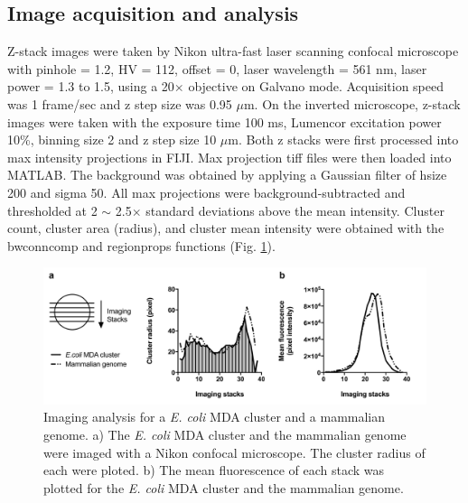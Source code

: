 \subsection{Image acquisition and analysis}
Z-stack images were taken by Nikon ultra-fast laser scanning confocal microscope with pinhole = 1.2, HV = 112, offset = 0, laser wavelength = 561 nm, laser power = 1.3 to 1.5, using a 20$\times$ objective on Galvano mode. Acquisition speed was 1 frame\slash sec and z step size was 0.95 $\mu$m. On the inverted microscope, z-stack images were taken with the exposure time 100 ms, Lumencor excitation power 10\%, binning size 2 and z step size 10 $\mu$m. Both z stacks were first processed into max intensity projections in FIJI. Max projection tiff files were then loaded into MATLAB. The background was obtained by applying a Gaussian filter of hsize 200 and sigma 50. All max projections were background-subtracted and thresholded at 2 $\sim$ 2.5$\times$ standard deviations above the mean intensity. Cluster count, cluster area (radius), and cluster mean intensity were obtained with the bwconncomp and regionprops functions (Fig. \ref{fig:dMDA_MammalianEcoliCluster}).

\begin{figure}
\centering
\includegraphics[keepaspectratio,width=1\textwidth]{./figures/MammalianEcoliCluster}
\caption[Imaging analysis for a \textit{E. coli} MDA cluster and a mammalian genome]{Imaging analysis for a \textit{E. coli} MDA cluster and a mammalian genome. a) The \textit{E. coli} MDA cluster and the mammalian genome were imaged with a Nikon confocal microscope. The cluster radius of each were ploted. b) The mean fluorescence of each stack was plotted for the \textit{E. coli} MDA cluster and the mammalian genome.}
\label{fig:dMDA_MammalianEcoliCluster}
\end{figure}